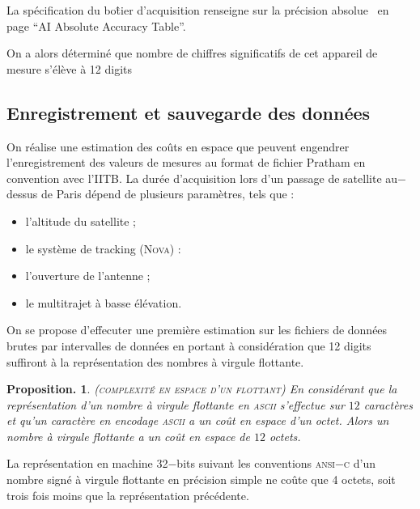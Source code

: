 \documentclass[twocolumn,pre,floats,aps,amsmath,amssymb]{revtex4}
\newtheorem{proposition}[theorem]{Proposition.}
\newenvironment{remark}[1][Remarque.]{\begin{trivlist}
\item[\hskip \labelsep {\bfseries #1}]}{\end{trivlist}}
\begin{document}
La sp\'ecification du bo\^tier d'acquisition renseigne sur la pr\'ecision absolue~\cite{NI_6353_datasheet} en page ``AI Absolute Accuracy Table''.

On a alors d\'etermin\'e que nombre de chiffres significatifs de cet appareil de mesure s'\'el\`eve \`a 12 digits

\subsection{Enregistrement et sauvegarde des donn\'ees}

On r\'ealise une estimation des co\^uts en espace que peuvent engendrer l'enregistrement des valeurs de mesures au format de fichier Pratham en convention avec l'IITB\cite{IITB_filespec}. La dur\'ee d'acquisition lors d'un passage de satellite au$-$dessus de Paris d\'epend de plusieurs param\`etres, tels que :
\begin{itemize}
\item{l'altitude du satellite ;}
\item{le syst\`eme de tracking (\textsc{Nova}) :}
\item{l'ouverture de l'antenne ;}
\item{le multitrajet \`a basse \'el\'evation.}
\end{itemize}

On se propose d'effecuter une premi\`ere estimation sur les fichiers de donn\'ees brutes par intervalles de donn\'ees en portant \`a consid\'eration que 12 digits suffiront \`a la repr\'esentation des nombres \`a virgule flottante.

\begin{proposition}
  (\textsc{complexit\'e en espace d'un flottant})
  En consid\'erant que la repr\'esentation d'un nombre \`a virgule flottante en \textsc{ascii} s'effectue sur $12$ caract\`eres et qu'un caract\`ere en encodage \textsc{ascii} a un co\^ut en espace d'un octet. Alors un nombre \`a virgule flottante a un co\^ut en espace de $12$ octets.
\end{proposition}

\begin{remark}
  La repr\'esentation en machine 32$-$bits\cite{Alexandridis} suivant les conventions \textsc{ansi$-$c} d'un nombre sign\'e \`a virgule flottante en pr\'ecision simple ne co\^ute que 4 octets\cite{Marshall}, soit trois fois moins que la repr\'esentation pr\'ec\'edente.
\end{remark}
\end{document}
